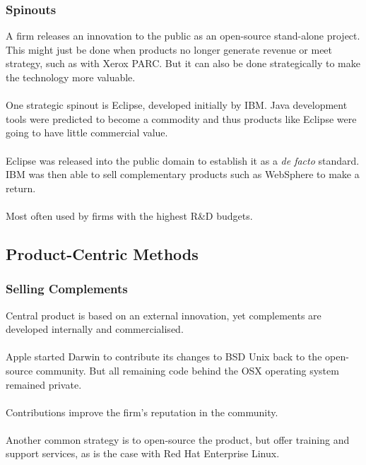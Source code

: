 \documentclass{beamer}
\begin{document}

\begin{frame}
\frametitle{Spinouts}
A firm releases an innovation to the public as an open-source stand-alone project. This might just be done when products no longer generate revenue or meet strategy, such as with Xerox PARC. But it can also be done strategically to make the technology more valuable.\\~\\

One strategic spinout is Eclipse, developed initially by IBM. Java development tools were predicted to become a commodity and thus products like Eclipse were going to have little commercial value.\\~\\

Eclipse was released into the public domain to establish it as a \textit{de facto} standard. IBM was then able to sell complementary products such as WebSphere to make a return.\\~\\

Most often used by firms with the highest R\&D budgets.
\end{frame}

\subsection{Product-Centric Methods}

\begin{frame}
\frametitle{Selling Complements}
Central product is based on an external innovation, yet complements are developed internally and commercialised.\\~\\

Apple started Darwin to contribute its changes to BSD Unix back to the open-source community. But all remaining code behind the OSX operating system remained private.\\~\\

Contributions improve the firm's reputation in the community.\\~\\

Another common strategy is to open-source the product, but offer training and support services, as is the case with Red Hat Enterprise Linux.
\end{frame}
\end{document}

